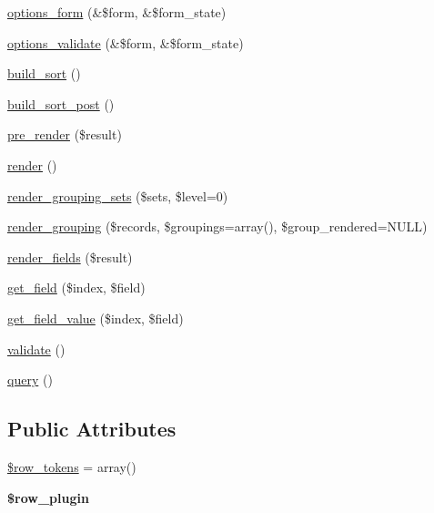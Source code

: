 \begin{DoxyCompactItemize}
\item 
\hyperlink{classviews__plugin__style_afe3d437ff4398315b15c4e60975dbb1c}{options\_\-form} (\&\$form, \&\$form\_\-state)
\item 
\hyperlink{classviews__plugin__style_acdfd8cc26a594b82aaf56d205ac83b36}{options\_\-validate} (\&\$form, \&\$form\_\-state)
\item 
\hyperlink{classviews__plugin__style_a13b4b43f813fde038a199d2ec26fc76e}{build\_\-sort} ()
\item 
\hyperlink{classviews__plugin__style_af59de962f895ccd0b3adf960b908e0bd}{build\_\-sort\_\-post} ()
\item 
\hyperlink{classviews__plugin__style_a9d35c181b927a52d8bf34ac629b05d20}{pre\_\-render} (\$result)
\item 
\hyperlink{classviews__plugin__style_aa52b618e91b11a7d10ad1feadbc891f1}{render} ()
\item 
\hyperlink{classviews__plugin__style_a1bbda7f308843509a043f5a0b10a90a8}{render\_\-grouping\_\-sets} (\$sets, \$level=0)
\item 
\hyperlink{classviews__plugin__style_a8406e6f92ae056facd207acab0b34898}{render\_\-grouping} (\$records, \$groupings=array(), \$group\_\-rendered=NULL)
\item 
\hyperlink{classviews__plugin__style_a95d504017017c611b482a920119452db}{render\_\-fields} (\$result)
\item 
\hyperlink{classviews__plugin__style_add1dccbb850840911c335ae09ff266d7}{get\_\-field} (\$index, \$field)
\item 
\hyperlink{classviews__plugin__style_a0af658171c8c1c5692a112f433de16c6}{get\_\-field\_\-value} (\$index, \$field)
\item 
\hyperlink{classviews__plugin__style_a41929fec27cb0ae7a801276969a080a1}{validate} ()
\item 
\hyperlink{classviews__plugin__style_af6b601d8f42cc3d86721fcad76eaae4b}{query} ()
\end{DoxyCompactItemize}
\subsection*{Public Attributes}
\begin{DoxyCompactItemize}
\item 
\hyperlink{classviews__plugin__style_a037a508debefb5ea44fc50d34e863ffc}{\$row\_\-tokens} = array()
\item 
\hypertarget{classviews__plugin__style_a1e249929118baf37e757a63f92b84f1f}{
{\bfseries \$row\_\-plugin}}
\label{classviews__plugin__style_a1e249929118baf37e757a63f92b84f1f}

\end{DoxyCompactItemize}


